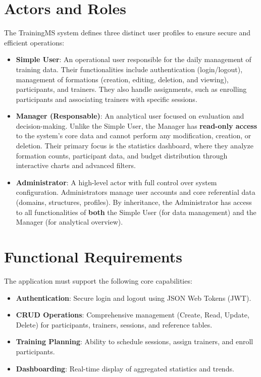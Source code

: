 \section{Actors and Roles}
The TrainingMS system defines three distinct user profiles to ensure secure and efficient operations:
\begin{itemize}
    \item \textbf{Simple User}: An operational user responsible for the daily management of training data. Their functionalities include authentication (login/logout), management of formations (creation, editing, deletion, and viewing), participants, and trainers. They also handle assignments, such as enrolling participants and associating trainers with specific sessions.
    \item \textbf{Manager (Responsable)}: An analytical user focused on evaluation and decision-making. Unlike the Simple User, the Manager has \textbf{read-only access} to the system's core data and cannot perform any modification, creation, or deletion. Their primary focus is the statistics dashboard, where they analyze formation counts, participant data, and budget distribution through interactive charts and advanced filters.
    \item \textbf{Administrator}: A high-level actor with full control over system configuration. Administrators manage user accounts and core referential data (domains, structures, profiles). By inheritance, the Administrator has access to all functionalities of \textbf{both} the Simple User (for data management) and the Manager (for analytical overview).
\end{itemize}

\section{Functional Requirements}
The application must support the following core capabilities:
\begin{itemize}
    \item \textbf{Authentication}: Secure login and logout using JSON Web Tokens (JWT).
    \item \textbf{CRUD Operations}: Comprehensive management (Create, Read, Update, Delete) for participants, trainers, sessions, and reference tables.
    \item \textbf{Training Planning}: Ability to schedule sessions, assign trainers, and enroll participants.
    \item \textbf{Dashboarding}: Real-time display of aggregated statistics and trends.
\end{itemize}

